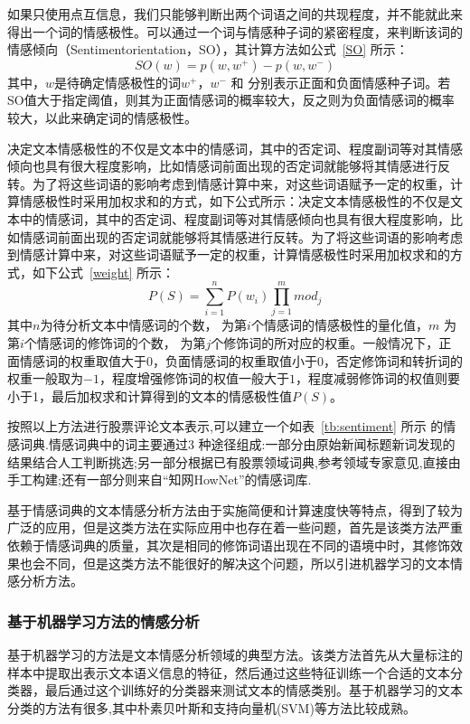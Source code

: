 \documentclass[cs4size,a4paper]{ctexart}
\numberwithin{equation}{section}
\numberwithin{table}{section}
\numberwithin{figure}{section}
\begin{document}
如果只使用点互信息，我们只能够判断出两个词语之间的共现程度，并不能就此来得出一个词的情感极性。可以通过一个词与情感种子词的紧密程度，来判断该词的情感倾向（Sentimentorientation，SO），其计算方法如公式~\ref{SO} 所示：
\begin{equation}\label{SO}
  SO(w) = p(w,w^{+})-p(w,w^-)
\end{equation}
其中，$w$是待确定情感极性的词$w^{+}$，$w^-$ 和 分别表示正面和负面情感种子词。若SO值大于指定阈值，则其为正面情感词的概率较大，反之则为负面情感词的概率较大，以此来确定词的情感极性。

决定文本情感极性的不仅是文本中的情感词，其中的否定词、程度副词等对其情感倾向也具有很大程度影响，比如情感词前面出现的否定词就能够将其情感进行反转。为了将这些词语的影响考虑到情感计算中来，对这些词语赋予一定的权重，计算情感极性时采用加权求和的方式，如下公式所示：决定文本情感极性的不仅是文本中的情感词，其中的否定词、程度副词等对其情感倾向也具有很大程度影响，比如情感词前面出现的否定词就能够将其情感进行反转。为了将这些词语的影响考虑到情感计算中来，对这些词语赋予一定的权重，计算情感极性时采用加权求和的方式，如下公式~\ref{weight} 所示：
\begin{equation}\label{weight}
  P(S) = \sum_{i=1}^{n}P(w_i)\prod_{j=1}^{m}mod_j
\end{equation}
其中$n$为待分析文本中情感词的个数， 为第$i$个情感词的情感极性的量化值，$m$ 为第$i$个情感词的修饰词的个数， 为第$j$个修饰词的所对应的权重。一般情况下，正面情感词的权重取值大于$0$，负面情感词的权重取值小于$0$，否定修饰词和转折词的权重一般取为$-1$，程度增强修饰词的权值一般大于$1$，程度减弱修饰词的权值则要小于1，最后加权求和计算得到的文本的情感极性值$P(S)$。

按照以上方法进行股票评论文本表示,可以建立一个如表~\ref{tb:sentiment} 所示 的情感词典.情感词典中的词主要通过3 种途径组成:一部分由原始新闻标题新词发现的结果结合人工判断挑选;另一部分根据已有股票领域词典,参考领域专家意见,直接由手工构建;还有一部分则来自“知网HowNet”的情感词库.

基于情感词典的文本情感分析方法由于实施简便和计算速度快等特点，得到了较为广泛的应用，但是这类方法在实际应用中也存在着一些问题，首先是该类方法严重依赖于情感词典的质量，其次是相同的修饰词语出现在不同的语境中时，其修饰效果也会不同，但是这类方法不能很好的解决这个问题，所以引进机器学习的文本情感分析方法。

\subsubsection{基于机器学习方法的情感分析}

基于机器学习的方法是文本情感分析领域的典型方法。该类方法首先从大量标注的样本中提取出表示文本语义信息的特征，然后通过这些特征训练一个合适的文本分类器，最后通过这个训练好的分类器来测试文本的情感类别。基于机器学习的文本分类的方法有很多,其中朴素贝叶斯和支持向量机(SVM)等方法比较成熟。
\end{document}
